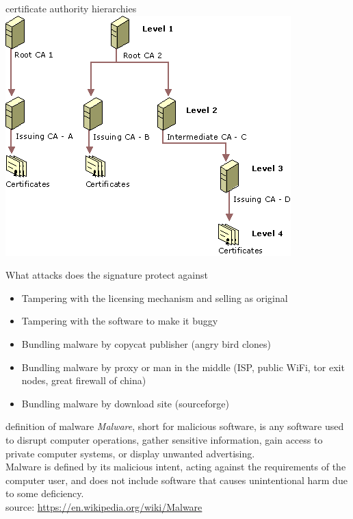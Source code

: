 \documentclass[11pt]{beamer}
\begin{document}
\begin{frame}{certificate authority hierarchies}
\includegraphics[scale=0.5]{certificate_authority_hierarchies.png}
\end{frame}

\begin{frame}{What attacks does the signature protect against}
\begin{itemize}
\item Tampering with the licensing mechanism and selling as original
\item Tampering with the software to make it buggy
\item Bundling malware by copycat publisher (angry bird clones)
\item Bundling malware by proxy or man in the middle (ISP, public WiFi, tor exit nodes, great firewall of china)
\item Bundling malware by download site (sourceforge)
\end{itemize}
\end{frame}

\begin{frame}{definition of malware}
\emph{Malware}, short for malicious software, is any software used to disrupt computer operations, gather sensitive information, gain access to private computer systems, or display unwanted advertising.
\\[0.2cm]
Malware is defined by its malicious intent, acting against the requirements of the computer user, and does not include software that causes unintentional harm due to some deficiency.
\\[0.2cm]
source: \href{https://en.wikipedia.org/wiki/Malware}{https://en.wikipedia.org/wiki/Malware}
\end{frame}
\end{document}
